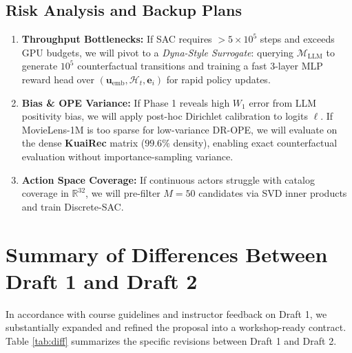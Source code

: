 \documentclass{article}
\begin{document}
\subsection{Risk Analysis and Backup Plans}
\begin{enumerate}
    \item \textbf{Throughput Bottlenecks:} If SAC requires $>5 \times 10^5$ steps and exceeds GPU budgets, we will pivot to a \textit{Dyna-Style Surrogate}: querying $\mathcal{M}_{\text{LLM}}$ to generate $10^5$ counterfactual transitions and training a fast 3-layer MLP reward head over $(\bm{u}_{\text{emb}}, \mathcal{H}_t, \bm{e}_i)$ for rapid policy updates.
    \item \textbf{Bias \& OPE Variance:} If Phase 1 reveals high $W_1$ error from LLM positivity bias, we will apply post-hoc Dirichlet calibration to logits $\bm{\ell}$. If MovieLens-1M is too sparse for low-variance DR-OPE, we will evaluate on the dense \textbf{KuaiRec} matrix ($99.6\%$ density), enabling exact counterfactual evaluation without importance-sampling variance.
    \item \textbf{Action Space Coverage:} If continuous actors struggle with catalog coverage in $\mathbb{R}^{32}$, we will pre-filter $M=50$ candidates via SVD inner products and train Discrete-SAC.
\end{enumerate}

\newpage



\newpage
\appendix

\section{Summary of Differences Between Draft 1 and Draft 2}
In accordance with course guidelines and instructor feedback on Draft 1, we substantially expanded and refined the proposal into a workshop-ready contract. Table \ref{tab:diff} summarizes the specific revisions between Draft 1 and Draft 2.
\end{document}
